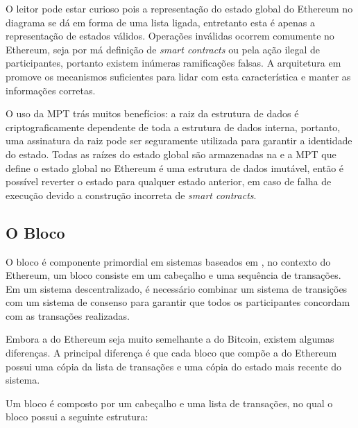 \documentclass[tcc,capa]{texufpel}
\begin{document}
    O leitor pode estar curioso pois a representação do estado global do Ethereum no diagrama se dá em forma de uma lista ligada, entretanto esta é apenas a representação de estados válidos. Operações inválidas ocorrem comumente no Ethereum, seja por má definição de \textit{smart contracts} ou pela ação ilegal de participantes, portanto existem inúmeras ramificações falsas. A arquitetura em \bchain promove os mecanismos suficientes para lidar com esta característica e manter as informações corretas.

	O uso da MPT trás muitos benefícios: a raiz da estrutura de dados é criptograficamente dependente de toda a estrutura de dados interna, portanto, uma assinatura da raiz pode ser seguramente utilizada para garantir a identidade do estado. Todas as raízes do estado global são armazenadas na \bchain e a MPT que define o estado global no Ethereum é uma estrutura de dados imutável, então é possível reverter o estado para qualquer estado anterior, em caso de falha de execução devido a construção incorreta de \textit{smart contracts}.
	
	
	\subsection{O Bloco}
	
	O bloco é componente primordial em sistemas baseados em \bchain, no contexto do Ethereum, um bloco consiste em um cabeçalho e uma sequência de transações. Em um sistema descentralizado, é necessário combinar um sistema de transições com um sistema de consenso para garantir que todos os participantes concordam com as transações realizadas.
	
	Embora a \bchain do Ethereum seja muito semelhante a \bchain do Bitcoin, existem algumas diferenças. A principal diferença é que cada bloco que compõe a \bchain do Ethereum possui uma cópia da lista de transações e uma cópia do estado mais recente do sistema.
	
	Um bloco é composto por um cabeçalho e uma lista de transações, no qual o bloco possui a seguinte estrutura:
	
\end{document}
